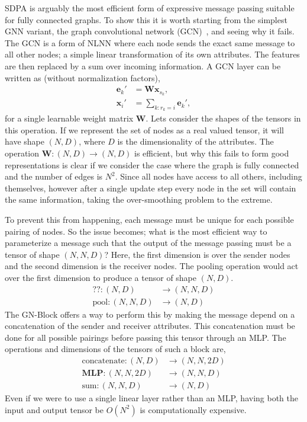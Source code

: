 SDPA is arguably the most efficient form of expressive message passing suitable for fully connected graphs.
To show this it is worth starting from the simplest GNN variant, the graph convolutional network (GCN)~, and seeing why it fails.
The GCN is a form of NLNN where each node sends the exact same message to all other nodes; a simple linear transformation of its own attributes.
The features are then replaced by a sum over incoming information.
A GCN layer can be written as (without normalization factors),
\begin{equation}
    \begin{aligned}
    \mathbf{e}_k' &= \mathbf{W} \mathbf{x}_{s_k}, \\
    \mathbf{x}_i' &= \sum_{k:r_k=i} \mathbf{e}_k',
    \end{aligned}
\end{equation}
for a single learnable weight matrix $\mathbf{W}$.
Lets consider the shapes of the tensors in this operation.
If we represent the set of nodes as a real valued tensor, it will have shape $(N, D)$, where $D$ is the dimensionality of the attributes.
The operation $\mathbf{W}: (N, D) \rightarrow (N, D)$ is efficient, but why this fails to form good representations is clear if we consider the case where the graph is fully connected and the number of edges is $N^2$.
Since all nodes have access to all others, including themselves, however after a single update step every node in the set will contain the same information, taking the over-smoothing problem to the extreme.

To prevent this from happening, each message must be unique for each possible pairing of nodes.
So the issue becomes; what is the most efficient way to parameterize a message such that the output of the message passing must be a tensor of shape $(N, N, D)$?
Here, the first dimension is over the sender nodes and the second dimension is the receiver nodes.
The pooling operation would act over the first dimension to produce a tensor of shape $(N, D)$.
\begin{align}
    \text{??}: (N, D) & \rightarrow (N, N, D) \\
    \text{pool}: (N, N, D) & \rightarrow (N, D)
\end{align}
The GN-Block offers a way to perform this by making the message depend on a concatenation of the sender and receiver attributes.
This concatenation must be done for all possible pairings before passing this tensor through an MLP.
The operations and dimensions of the tensors of such a block are,
\begin{align}
    \text{concatenate}: (N, D) & \rightarrow (N, N, 2D) \\
    \mathbf{MLP}: (N, N, 2D) & \rightarrow (N, N, D) \\
    \text{sum}: (N, N, D) & \rightarrow (N, D)
\end{align}
Even if we were to use a single linear layer rather than an MLP, having both the input and output tensor be $O(N^2)$ is computationally expensive.


